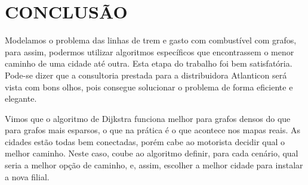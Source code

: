 \documentclass[12pt]{article}
\begin{document}
\section{CONCLUSÃO}
\label{conclusao}

    Modelamos o problema das linhas de trem e gasto com combustível com grafos, para assim, podermos utilizar algoritmos específicos que encontrassem o menor caminho de uma cidade até outra. Esta etapa do trabalho foi bem satisfatória. Pode-se dizer que a consultoria prestada para a distribuidora Atlanticon será vista com bons olhos, pois consegue solucionar o problema de forma eficiente e elegante.

    Vimos que o algoritmo de Dijkstra funciona melhor para grafos densos do que para grafos mais esparsos, o que na prática é o que acontece nos mapas reais. As cidades estão todas bem conectadas, porém cabe ao motorista decidir qual o melhor caminho. Neste caso, coube ao algoritmo definir, para cada cenário, qual seria a melhor opção de caminho, e, assim, escolher a melhor cidade para instalar a nova filial.



\end{document}

